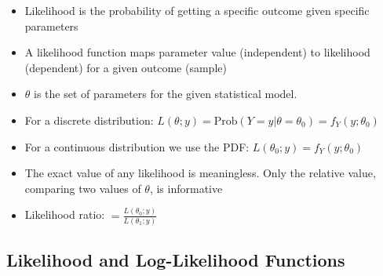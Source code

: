\documentclass{article}
\begin{document}
\begin{itemize}
    \item Likelihood is the probability of getting a specific outcome given specific parameters
    \item A likelihood function maps parameter value (independent) to likelihood (dependent) for a given outcome (sample)
    \item $\theta$ is the set of parameters for the given statistical model.
    \item For a discrete distribution: $L(\theta;y)=\text{Prob}(Y=y|\theta=\theta_0)=f_Y(y;\theta_0)$
    \item For a continuous distribution we use the PDF: $L(\theta_0;y)=f_Y(y;\theta_0)$
    \item The exact value of any likelihood is meaningless. Only the relative value, comparing two values of $\theta$, is informative
    \item Likelihood ratio: $=\frac{L(\theta_0;y)}{L(\theta_1;y)}$
\end{itemize}

\subsection{Likelihood and Log-Likelihood Functions}
\end{document}
